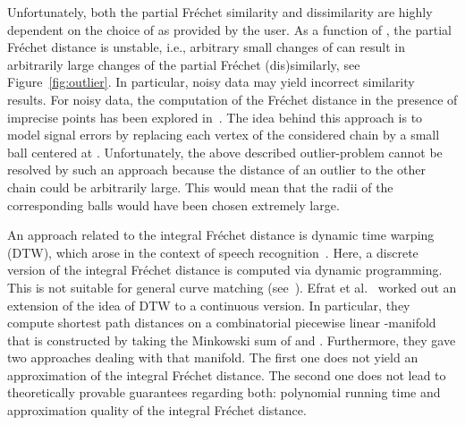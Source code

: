 \documentclass[a4paper,11pt]{article}
\begin{document}
	Unfortunately, both the partial Fr\'{e}chet similarity and dissimilarity are highly dependent on  the choice of  as provided by the user. As a function of , the partial Fr\'{e}chet distance is unstable, i.e., arbitrary small changes of  can result in arbitrarily large changes of the partial Fr\'{e}chet (dis)similarly, see Figure~\ref{fig:outlier}. In particular, noisy data may yield  incorrect similarity results. For noisy data,   the computation of the Fr\'{e}chet distance in the presence of imprecise points has been explored in~\cite{ahn:imprecise}. The idea behind this approach is to model signal errors by replacing each vertex  of the considered chain  by a small ball centered at . Unfortunately, the above described outlier-problem cannot be resolved by such an approach because the distance of an outlier to the other chain  could be arbitrarily large. This would mean that the radii of the corresponding balls would have been chosen extremely large.
	


	An approach related to the integral Fr\'{e}chet distance is dynamic time warping (DTW), which arose in the context of speech recognition~\cite{rabiner:fundamentals}. Here, a discrete version of the integral Fr\'{e}chet distance is computed via dynamic programming. This is not suitable for general curve matching (see~\cite[p. 204]{efrat:mathching}). Efrat et al.~\cite{efrat:mathching} worked out an extension of the idea of DTW to a continuous version. In particular, they  compute shortest path distances on a combinatorial piecewise linear -manifold that is constructed by taking the Minkowski sum of  and . Furthermore, they gave two approaches dealing with that manifold. The first one does not yield an approximation of the integral Fr\'{e}chet distance. The second one does not lead to theoretically provable guarantees regarding both: polynomial running time and approximation quality of the integral Fr\'{e}chet distance.  
	
\end{document}
